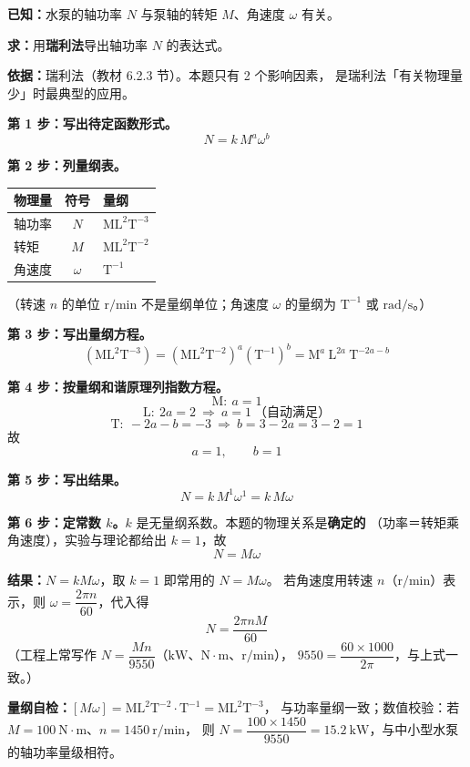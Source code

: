 \begin{jie}
\textbf{已知：}水泵的轴功率 $N$ 与泵轴的转矩 $M$、角速度 $\omega$ 有关。

\textbf{求：}用\textbf{瑞利法}导出轴功率 $N$ 的表达式。

\textbf{依据：}瑞利法（教材 6.2.3 节）。本题只有 2 个影响因素，
是瑞利法「有关物理量少」时最典型的应用。

\textbf{第 1 步：写出待定函数形式。}
\[ N=k\,M^{a}\omega^{b} \]

\textbf{第 2 步：列量纲表。}

\begin{center}
\begin{tabularx}{\textwidth}{@{}lcX@{}}
\toprule
物理量 & 符号 & 量纲 \\
\midrule
轴功率 & $N$ & $\mathrm{ML^{2}T^{-3}}$ \\
转矩 & $M$ & $\mathrm{ML^{2}T^{-2}}$ \\
角速度 & $\omega$ & $\mathrm{T^{-1}}$ \\
\bottomrule
\end{tabularx}
\end{center}

（转速 $n$ 的单位 $\mathrm{r/min}$ 不是量纲单位；角速度 $\omega$ 的量纲为 $\mathrm{T^{-1}}$ 或 $\mathrm{rad/s}$。）

\textbf{第 3 步：写出量纲方程。}
\[ \left(\mathrm{ML^{2}T^{-3}}\right)
   =\left(\mathrm{ML^{2}T^{-2}}\right)^{a}\left(\mathrm{T^{-1}}\right)^{b}
   =\mathrm{M}^{a}\ \mathrm{L}^{2a}\ \mathrm{T}^{-2a-b} \]

\textbf{第 4 步：按量纲和谐原理列指数方程。}
\[ \mathrm{M}:\ a=1 \]
\[ \mathrm{L}:\ 2a=2\ \Longrightarrow\ a=1\ \text{（自动满足）} \]
\[ \mathrm{T}:\ -2a-b=-3\ \Longrightarrow\ b=3-2a=3-2=1 \]
故
\[ a=1,\qquad b=1 \]

\textbf{第 5 步：写出结果。}
\[ N=k\,M^{1}\omega^{1}=k\,M\omega \]

\textbf{第 6 步：定常数 $k$。}$k$ 是无量纲系数。本题的物理关系是\textbf{确定的}
（功率＝转矩乘角速度），实验与理论都给出 $k=1$，故
\[ \boxed{\ N=M\omega\ } \]

\textbf{结果：}$N=kM\omega$，取 $k=1$ 即常用的 $N=M\omega$。
若角速度用转速 $n$（$\mathrm{r/min}$）表示，则 $\omega=\dfrac{2\pi n}{60}$，代入得
\[ N=\frac{2\pi n M}{60} \]
（工程上常写作 $N=\dfrac{Mn}{9550}$（$\mathrm{kW}$、$\mathrm{N\cdot m}$、$\mathrm{r/min}$），
$9550=\dfrac{60\times1000}{2\pi}$，与上式一致。）

\textbf{量纲自检：}$[M\omega]=\mathrm{ML^{2}T^{-2}}\cdot\mathrm{T^{-1}}=\mathrm{ML^{2}T^{-3}}$，
与功率量纲一致；数值校验：若 $M=100\ \mathrm{N\cdot m}$、$n=1450\ \mathrm{r/min}$，
则 $N=\dfrac{100\times1450}{9550}=15.2\ \mathrm{kW}$，与中小型水泵的轴功率量级相符。
\end{jie}

